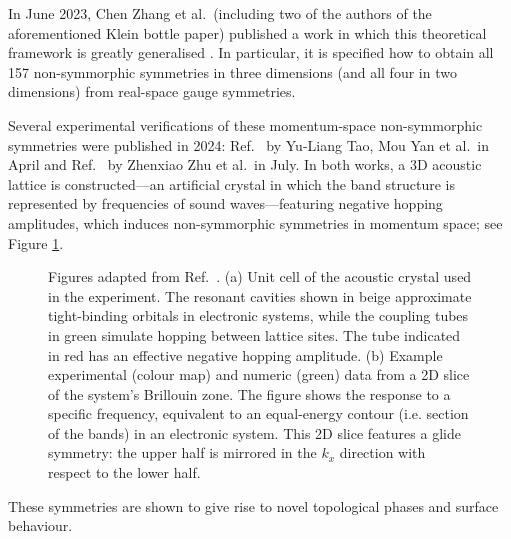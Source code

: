 In June 2023, Chen Zhang et al.\ (including two of the authors of the aforementioned Klein bottle paper) published a work in which this theoretical framework is greatly generalised \cite{Zhang_nonsymmorphic}. In particular, it is specified how to obtain all 157 non-symmorphic symmetries in three dimensions (and all four in two dimensions) from real-space gauge symmetries.

Several experimental verifications of these momentum-space non-symmorphic symmetries were published in 2024: Ref.~\cite{TaoYan_acoustic-Klein} by Yu-Liang Tao, Mou Yan et al.\ in April and Ref.~\cite{Zhu_acoustic-Klein-halfturn} by Zhenxiao Zhu et al.\ in July. In both works, a 3D acoustic lattice is constructed---an artificial crystal in which the band structure is represented by frequencies of sound waves---featuring negative hopping amplitudes, which induces non-symmorphic symmetries in momentum space; see Figure \ref{fig:acoustic-Klein}.
\begin{figure}[htb!]
	\centering
	\hfil
	\caption{Figures adapted from Ref.~\cite{Zhu_acoustic-Klein-halfturn}. (a) Unit cell of the acoustic crystal used in the experiment. The resonant cavities shown in beige approximate tight-binding orbitals in electronic systems, while the coupling tubes in green simulate hopping between lattice sites. The tube indicated in red has an effective negative hopping amplitude. (b) Example experimental (colour map) and numeric (green) data from a 2D slice of the system's Brillouin zone. The figure shows the response to a specific frequency, equivalent to an equal-energy contour (i.e. section of the bands) in an electronic system. This 2D slice features a glide symmetry: the upper half is mirrored in the $k_x$ direction with respect to the lower half.} %
	\label{fig:acoustic-Klein}
\end{figure}
These symmetries are shown to give rise to novel topological phases and surface behaviour.

